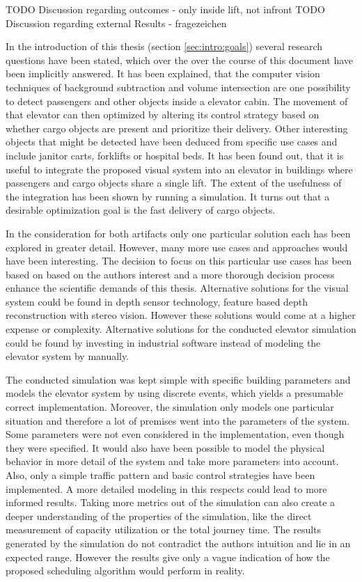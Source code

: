 TODO Discussion regarding outcomes
- only inside lift, not infront
TODO Discussion regarding external Results 
- fragezeichen

In the introduction of this thesis (section \ref{sec:intro:goals}) several research questions have been stated,
which over the over the course of this document have been implicitly answered.
It has been explained, that the computer vision techniques of background subtraction and volume intersection are one possibility to detect passengers and other objects inside a elevator cabin. The movement of that elevator can then optimized by altering its control strategy based on whether cargo objects are present and prioritize their delivery.
Other interesting objects that might be detected have been deduced from specific use cases and include janitor carts, forklifts or hospital beds.
It has been found out, 
that it  is useful to integrate the proposed visual system into an elevator in buildings where passengers and cargo objects share a single lift.
The extent of the usefulness of the integration has been shown by running a simulation. 
It turns out that a desirable optimization goal is the fast delivery of cargo objects.

In the consideration for both artifacts only one particular solution each has been explored in greater detail.
However, many more use cases and approaches would have been interesting.
The decision to focus on this particular use cases has been based on based on the authors interest and a more thorough decision process enhance the scientific demands of this thesis.
Alternative solutions for the visual system could be found in depth sensor technology, feature based depth reconstruction with stereo vision.
However these solutions would come at a higher expense or complexity.
Alternative solutions for the conducted elevator simulation could be found by investing in industrial software instead of modeling the elevator system by manually. 

The conducted simulation was kept simple with specific building parameters 
and models the elevator system by using discrete events, which yields a presumable correct implementation.
Moreover, the simulation only models one particular situation and therefore a lot of premises went into the parameters of the system.
Some parameters were not even considered in the implementation, even though they were specified.
It would also have been possible to model the physical behavior in more detail of the system and take more parameters into account.
Also, only a simple traffic pattern and basic control strategies have been implemented. 
A more detailed modeling in this respects could lead to more informed results. 
Taking more metrics out of the simulation can also create a deeper understanding of the properties of the simulation, like the direct measurement of capacity utilization or the total journey time.
The results generated by the simulation do not contradict the authors intuition and lie in an expected range. 
However the results give only a vague indication of how the proposed scheduling algorithm would perform in reality.

